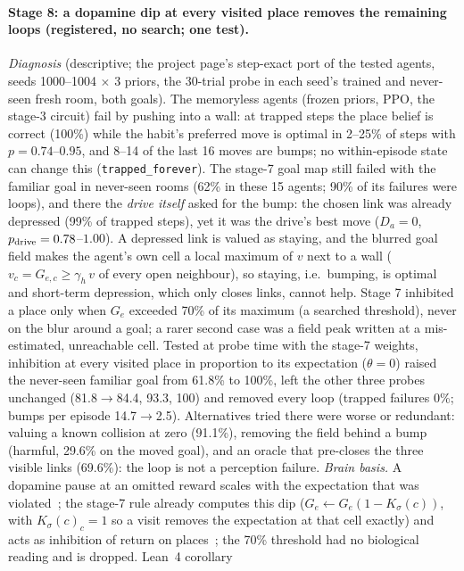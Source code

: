 \documentclass[10pt,onecolumn,letterpaper]{article}
\begin{document}
\paragraph{Stage 8: a dopamine dip at every visited place removes the remaining loops (registered, no search; one test).}
\emph{Diagnosis} (descriptive; the project page's step-exact port of the tested agents, seeds 1000--1004 $\times$ 3 priors, the
30-trial probe in each seed's trained and never-seen fresh room, both goals). The memoryless agents (frozen priors, PPO, the
stage-3 circuit) fail by pushing into a wall: at trapped steps the place belief is correct (100\%) while the habit's preferred move
is optimal in 2--25\% of steps with $p=0.74$--$0.95$, and 8--14 of the last 16 moves are bumps; no within-episode state can change
this (\texttt{trapped\_forever}). The stage-7 goal map still failed with the familiar goal in never-seen rooms (62\% in these 15
agents; 90\% of its failures were loops), and there the \emph{drive itself} asked for the bump: the chosen link was already
depressed (99\% of trapped steps), yet it was the drive's best move ($D_a=0$, $p_{\rm drive}=0.78$--$1.00$). A depressed link is
valued as staying, and the blurred goal field makes the agent's own cell a local maximum of $v$ next to a wall
($v_c=G_{e,c}\ge\gamma_h\,v$ of every open neighbour), so staying, i.e.\ bumping, is optimal and short-term depression, which only
closes links, cannot help. Stage 7 inhibited a place only when $G_e$ exceeded 70\% of its maximum (a searched threshold), never on
the blur around a goal; a rarer second case was a field peak written at a mis-estimated, unreachable cell. Tested at probe time with
the stage-7 weights, inhibition at every visited place in proportion to its expectation ($\theta=0$) raised the never-seen familiar
goal from 61.8\% to 100\%, left the other three probes unchanged (81.8$\to$84.4, 93.3, 100) and removed every loop (trapped failures
0\%; bumps per episode 14.7$\to$2.5). Alternatives tried there were worse or redundant: valuing a known collision at zero (91.1\%),
removing the field behind a bump (harmful, 29.6\% on the moved goal), and an oracle that pre-closes the three visible links (69.6\%):
the loop is not a perception failure. \emph{Brain basis.} A dopamine pause at an omitted reward scales with the expectation that
was violated~\cite{schultz1997,hollerman1998}; the stage-7 rule already computes this dip ($G_e\leftarrow G_e(1-K_\sigma(c))$,
with $K_\sigma(c)_c=1$ so a visit removes the expectation at that cell exactly) and acts as inhibition of return on
places~\cite{posner1984}; the 70\% threshold had no biological reading and is dropped. Lean~4 corollary
\end{document}

